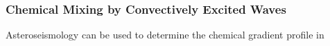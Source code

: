 {\color{purple}
\subsubsection{Chemical Mixing by Convectively Excited Waves}
}

Asteroseismology can be used to determine the chemical gradient profile in 

